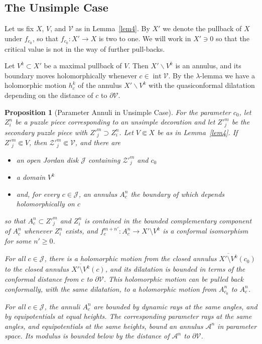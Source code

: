 \documentclass[12pt,a4paper]{amsart}
\newtheorem{proposition}[theorem]{Proposition}
\newcommand{\JJ}{\mathcal J}
\renewcommand{\AA}{\mathcal A}
\newcommand{\VV}{\mathcal V}
\newcommand{\ZZ}{\mathcal Z}
\newcommand{\sm}{\setminus}
\newcommand{\ovl}{\overline}
\newcommand{\intr}{\operatorname{int}}
\begin{document}
\subsection{The Unsimple Case}
\label{Sub:Unsimple} Let us fix  $X$, $V$, and $\VV$ as in
Lemma~\ref{lem4}. By $X'$ we denote the pullback of $X$ under
$f_{c_0}$, so that $f_{c_0}:X'\rightarrow X$ is two to one. We will
work in $X'\ni 0$ so that the critical value is not in the way of
further pull-backs.

Let $V^{k}\subset X'$ be a maximal pullback of $V$. Then
$X'\backslash V^{k}$ is an annulus, and its boundary moves
holomorphically whenever $c\in \intr  \VV$. By the $\lambda$-lemma
we have a holomorphic motion $h^k_c$ of the annulus $X'\backslash
V^{k}$ with the quasiconformal dilatation depending on the distance
of $c$ to $\partial\VV$.




\begin{proposition}[Parameter Annuli in Unsimple Case]
\label{prop3} For the parameter $c_0$, let $Z^n_i$ be a puzzle piece
corresponding to an unsimple decoration and let $Z'^m_j$ be the
secondary puzzle piece with $Z'^m_j\supset Z^n_i$. Let $V\Subset X$
be as in Lemma~\ref{lem4}. If $Z'^m_j\Subset V$, then
$\ZZ'^m_j\Subset\VV$, and there are

\begin{itemize}
\item
an open Jordan disk $\JJ$ containing $\ZZ'^m_j$ and $c_0$
\item
a domain $V^k$
\item
and, for every $c\in\JJ$, an annulus $A^n_c$ the boundary of which
depends holomorphically on $c$
\end{itemize}
so that  $A^n_c\subset Z'^m_j$ and $Z^n_i$ is contained in the
bounded complementary component of $A^n_c$ whenever $Z^n_i$ exists,
and $f_c^{m+n'}\colon A^n_c\to X'\sm V^k$ is a conformal isomorphism
for some $n'\ge 0$.

For all $c\in\JJ$, there is a holomorphic motion from the closed
annulus $\ovl{X'\sm V^k}(c_0)$ to the closed annulus $\ovl{X'\sm
V^k}(c)$, and its dilatation is bounded in terms of the conformal
distance from $c$ to $\partial\VV$. This holomorphic motion can be
pulled back conformally, with the same dilatation, to a holomorphic
motion from $A^n_{c_0}$ to $A^n_c$.

For all $c\in\JJ$, the annuli $A^n_c$ are bounded by dynamic rays at
the same angles, and by equipotentials at equal heights. The
corresponding parameter rays at the same angles, and equipotentials
at the same heights, bound an annulus $\AA^n$ in parameter space.
Its modulus is bounded below by the distance of $\AA^n$ to
$\partial\VV$.
\end{proposition}
\end{document}

